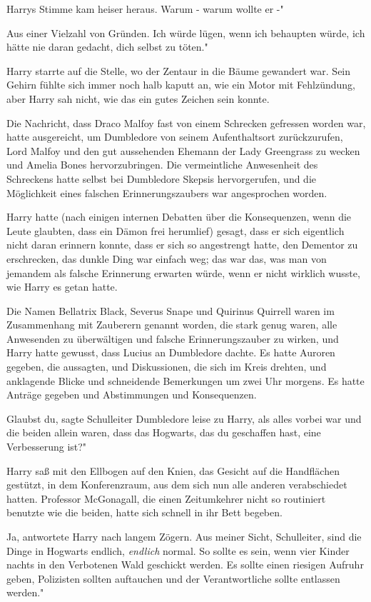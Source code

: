Harrys Stimme kam heiser heraus. \glqq{}Warum - warum wollte er -"

\glqq{}Aus einer Vielzahl von Gründen. Ich würde lügen, wenn ich behaupten würde,
ich hätte nie daran gedacht, dich selbst zu töten."

Harry starrte auf die Stelle, wo der Zentaur in die Bäume gewandert war. Sein
Gehirn fühlte sich immer noch halb kaputt an, wie ein Motor mit Fehlzündung,
aber Harry sah nicht, wie das ein gutes Zeichen sein konnte.

Die Nachricht, dass Draco Malfoy fast von einem Schrecken gefressen worden war,
hatte ausgereicht, um Dumbledore von seinem Aufenthaltsort zurückzurufen, Lord
Malfoy und den gut aussehenden Ehemann der Lady Greengrass zu wecken und Amelia
Bones hervorzubringen. Die vermeintliche Anwesenheit des Schreckens hatte selbst
bei Dumbledore Skepsis hervorgerufen, und die Möglichkeit eines falschen
Erinnerungszaubers war angesprochen worden.

Harry hatte (nach einigen internen Debatten über die Konsequenzen, wenn die
Leute glaubten, dass ein Dämon frei herumlief) gesagt, dass er sich eigentlich
nicht daran erinnern konnte, dass er sich so angestrengt hatte, den Dementor zu
erschrecken, das dunkle Ding war einfach weg; das war das, was man von jemandem
als falsche Erinnerung erwarten würde, wenn er nicht wirklich wusste, wie Harry
es getan hatte.

Die Namen Bellatrix Black, Severus Snape und Quirinus Quirrell waren im
Zusammenhang mit Zauberern genannt worden, die stark genug waren, alle
Anwesenden zu überwältigen und falsche Erinnerungszauber zu wirken, und Harry
hatte gewusst, dass Lucius an Dumbledore dachte. Es hatte Auroren gegeben, die
aussagten, und Diskussionen, die sich im Kreis drehten, und anklagende Blicke
und schneidende Bemerkungen um zwei Uhr morgens. Es hatte Anträge gegeben und
Abstimmungen und Konsequenzen.

\glqq{}Glaubst du\grqq{}, sagte Schulleiter Dumbledore leise zu Harry, als alles
vorbei war und die beiden allein waren, \glqq{}dass das Hogwarts, das du
geschaffen hast, eine Verbesserung ist?"

Harry saß mit den Ellbogen auf den Knien, das Gesicht auf die Handflächen
gestützt, in dem Konferenzraum, aus dem sich nun alle anderen verabschiedet
hatten. Professor McGonagall, die einen Zeitumkehrer nicht so routiniert
benutzte wie die beiden, hatte sich schnell in ihr Bett begeben.

\glqq{}Ja\grqq{}, antwortete Harry nach langem Zögern. \glqq{}Aus meiner Sicht,
Schulleiter, sind die Dinge in Hogwarts endlich, \emph{endlich} normal. So
sollte es sein, wenn vier Kinder nachts in den Verbotenen Wald geschickt werden.
Es sollte einen riesigen Aufruhr geben, Polizisten sollten auftauchen und der
Verantwortliche sollte entlassen werden."

